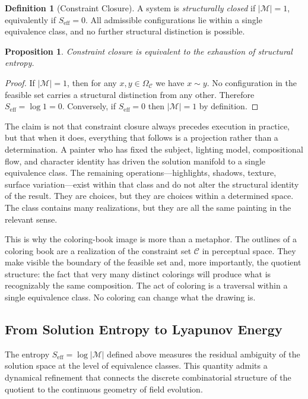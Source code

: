 \documentclass[11pt, twoside]{article}
\theoremstyle{plain}
\newtheorem{proposition}[theorem]{Proposition}
\theoremstyle{definition}
\newtheorem{definition}[theorem]{Definition}
\theoremstyle{remark}
\newcommand{\OmC}{\Omega_{\mathcal{C}}}
\newcommand{\Seff}{S_{\text{eff}}}
\begin{document}
\begin{definition}[Constraint Closure]
\label{def:closure}
A system is \emph{structurally closed} if $|\mathcal{M}| = 1$, equivalently if $\Seff = 0$. All admissible configurations lie within a single equivalence class, and no further structural distinction is possible.
\end{definition}

\begin{proposition}
\label{prop:closure-entropy}
Constraint closure is equivalent to the exhaustion of structural entropy.
\end{proposition}

\begin{proof}
If $|\mathcal{M}| = 1$, then for any $x, y \in \OmC$ we have $x \sim y$. No configuration in the feasible set carries a structural distinction from any other. Therefore $\Seff = \log 1 = 0$. Conversely, if $\Seff = 0$ then $|\mathcal{M}| = 1$ by definition.
\end{proof}

The claim is not that constraint closure always precedes execution in practice, but that when it does, everything that follows is a projection rather than a determination. A painter who has fixed the subject, lighting model, compositional flow, and character identity has driven the solution manifold to a single equivalence class. The remaining operations---highlights, shadows, texture, surface variation---exist within that class and do not alter the structural identity of the result. They are choices, but they are choices within a determined space. The class contains many realizations, but they are all the same painting in the relevant sense.

This is why the coloring-book image is more than a metaphor. The outlines of a coloring book are a realization of the constraint set $\mathcal{C}$ in perceptual space. They make visible the boundary of the feasible set and, more importantly, the quotient structure: the fact that very many distinct colorings will produce what is recognizably the same composition. The act of coloring is a traversal within a single equivalence class. No coloring can change what the drawing is.

\subsection{From Solution Entropy to Lyapunov Energy}

The entropy $\Seff = \log |\mathcal{M}|$ defined above measures the residual ambiguity of the solution space at the level of equivalence classes. This quantity admits a dynamical refinement that connects the discrete combinatorial structure of the quotient to the continuous geometry of field evolution.
\end{document}
